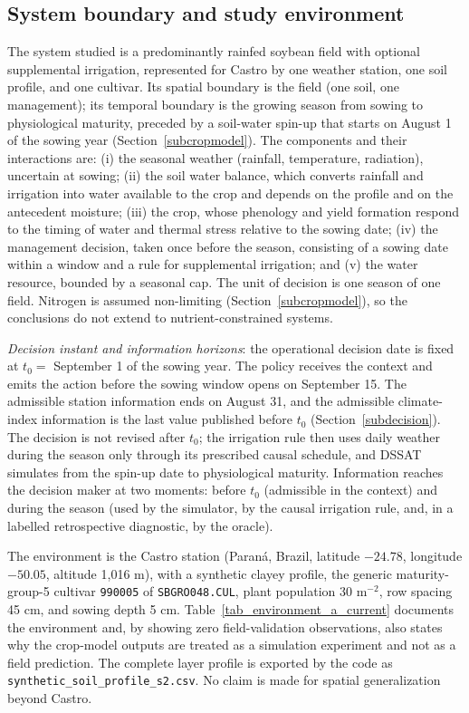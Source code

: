 \documentclass[times,final,authoryear]{elsarticle}
\begin{document}
\subsection{System boundary and study environment}
\label{subsystem}

The system studied is a predominantly rainfed soybean field with optional supplemental irrigation, represented for Castro by one weather station, one soil profile, and one cultivar. Its spatial boundary is the field (one soil, one management); its temporal boundary is the growing season from sowing to physiological maturity, preceded by a soil-water spin-up that starts on August 1 of the sowing year (Section~\ref{subcropmodel}). The components and their interactions are: (i) the seasonal weather (rainfall, temperature, radiation), uncertain at sowing; (ii) the soil water balance, which converts rainfall and irrigation into water available to the crop and depends on the profile and on the antecedent moisture; (iii) the crop, whose phenology and yield formation respond to the timing of water and thermal stress relative to the sowing date; (iv) the management decision, taken once before the season, consisting of a sowing date within a window and a rule for supplemental irrigation; and (v) the water resource, bounded by a seasonal cap. The unit of decision is one season of one field. Nitrogen is assumed non-limiting (Section~\ref{subcropmodel}), so the conclusions do not extend to nutrient-constrained systems.

\emph{Decision instant and information horizons}: the operational decision date is fixed at $t_0=$ September 1 of the sowing year. The policy receives the context and emits the action before the sowing window opens on September 15. The admissible station information ends on August 31, and the admissible climate-index information is the last value published before $t_0$ (Section~\ref{subdecision}). The decision is not revised after $t_0$; the irrigation rule then uses daily weather during the season only through its prescribed causal schedule, and DSSAT simulates from the spin-up date to physiological maturity. Information reaches the decision maker at two moments: before $t_0$ (admissible in the context) and during the season (used by the simulator, by the causal irrigation rule, and, in a labelled retrospective diagnostic, by the oracle).

The environment is the Castro station (Paraná, Brazil, latitude $-24.78$, longitude $-50.05$, altitude 1,016 m), with a synthetic clayey profile, the generic maturity-group-5 cultivar \texttt{990005} of \texttt{SBGRO048.CUL}, plant population 30 m$^{-2}$, row spacing 45 cm, and sowing depth 5 cm. Table~\ref{tab_environment_a_current} documents the environment and, by showing zero field-validation observations, also states why the crop-model outputs are treated as a simulation experiment and not as a field prediction. The complete layer profile is exported by the code as \texttt{synthetic\_soil\_profile\_s2.csv}. No claim is made for spatial generalization beyond Castro.
\end{document}
